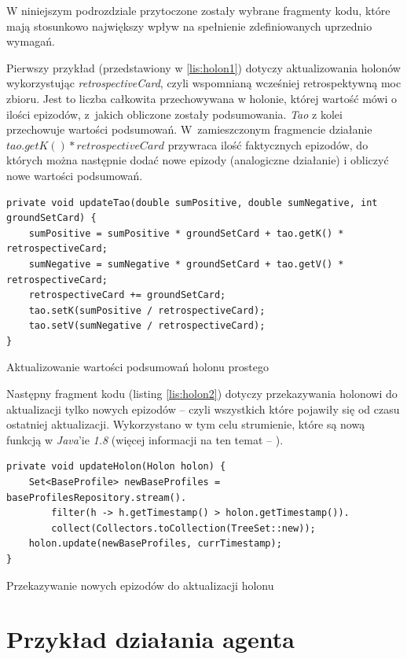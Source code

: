 W niniejszym podrozdziale przytoczone zostały wybrane fragmenty kodu, które mają stosunkowo największy wpływ na spełnienie zdefiniowanych uprzednio wymagań.

Pierwszy przykład (przedstawiony w \ref{lis:holon1}) dotyczy aktualizowania holonów wykorzystując \textit{retrospectiveCard}, czyli wspomnianą wcześniej retrospektywną moc zbioru. Jest to liczba całkowita przechowywana w holonie, której wartość mówi o ilości epizodów, z~jakich obliczone zostały podsumowania. \textit{Tao} z kolei przechowuje wartości podsumowań. W~zamieszczonym fragmencie działanie $ tao.getK() * retrospectiveCard $ przywraca ilość faktycznych epizodów, do których można następnie dodać nowe epizody (analogiczne działanie) i obliczyć nowe wartości podsumowań.

\begin{listing}
\begin{verbatim} 
private void updateTao(double sumPositive, double sumNegative, int groundSetCard) {
	sumPositive = sumPositive * groundSetCard + tao.getK() * retrospectiveCard;
	sumNegative = sumNegative * groundSetCard + tao.getV() * retrospectiveCard;
	retrospectiveCard += groundSetCard;
	tao.setK(sumPositive / retrospectiveCard);
	tao.setV(sumNegative / retrospectiveCard);
}
\end{verbatim}
	\caption{Aktualizowanie wartości podsumowań holonu prostego} 
	\label{lis:holon1}
\end{listing}

Następny fragment kodu (listing \ref{lis:holon2}) dotyczy przekazywania holonowi do aktualizacji tylko nowych epizodów -- czyli wszystkich które pojawiły się od czasu ostatniej aktualizacji. Wykorzystano w tym celu strumienie, które są nową funkcją w \textit{Java}'ie \textit{1.8} (więcej informacji na ten temat -- \cite{java}).

\begin{listing}
\begin{verbatim} 
private void updateHolon(Holon holon) {
	Set<BaseProfile> newBaseProfiles = baseProfilesRepository.stream().
		filter(h -> h.getTimestamp() > holon.getTimestamp()).
		collect(Collectors.toCollection(TreeSet::new));
	holon.update(newBaseProfiles, currTimestamp);
}
\end{verbatim}
	\caption{Przekazywanie nowych epizodów do aktualizacji holonu} 
	\label{lis:holon2}
\end{listing}


\section{Przykład działania agenta}

